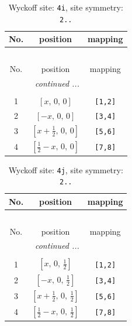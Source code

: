 \documentclass[fleqn,8pt]{jsarticle}
\begin{document}
\begin{longtable}{ccc}
\caption{Wyckoff site: {\tt 4i}, site symmetry: {\tt 2..}}
 \\
 \hline \hline
No. & position & mapping \\ \hline \endfirsthead

\multicolumn{2}{l}{\tablename\ \thetable{}} \\
 \hline \hline
No. & position & mapping \\ \hline \endhead

 \hline \hline
\multicolumn{2}{r}{\footnotesize\it continued ...} \\ \endfoot

 \hline \hline
\multicolumn{2}{r}{} \\ \endlastfoot

1 & $\left[ x,\, 0,\, 0 \right]$ & {\tt [1,2]} \\ \hline
2 & $\left[ - x,\, 0,\, 0 \right]$ & {\tt [3,4]} \\ \hline
3 & $\left[ x + \frac{1}{2},\, 0,\, 0 \right]$ & {\tt [5,6]} \\ \hline
4 & $\left[ \frac{1}{2} - x,\, 0,\, 0 \right]$ & {\tt [7,8]} \\
\end{longtable}
\renewcommand{\arraystretch}{1.2}
\begin{longtable}{ccc}
\caption{Wyckoff site: {\tt 4j}, site symmetry: {\tt 2..}}
 \\
 \hline \hline
No. & position & mapping \\ \hline \endfirsthead

\multicolumn{2}{l}{\tablename\ \thetable{}} \\
 \hline \hline
No. & position & mapping \\ \hline \endhead

 \hline \hline
\multicolumn{2}{r}{\footnotesize\it continued ...} \\ \endfoot

 \hline \hline
\multicolumn{2}{r}{} \\ \endlastfoot

1 & $\left[ x,\, 0,\, \frac{1}{2} \right]$ & {\tt [1,2]} \\ \hline
2 & $\left[ - x,\, 0,\, \frac{1}{2} \right]$ & {\tt [3,4]} \\ \hline
3 & $\left[ x + \frac{1}{2},\, 0,\, \frac{1}{2} \right]$ & {\tt [5,6]} \\ \hline
4 & $\left[ \frac{1}{2} - x,\, 0,\, \frac{1}{2} \right]$ & {\tt [7,8]} \\
\end{longtable}
\end{document}
